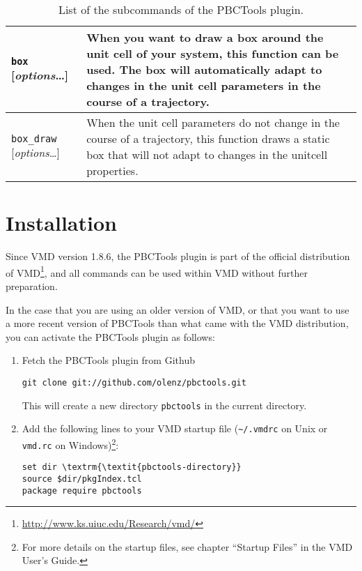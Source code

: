 \documentclass[a4paper, DIV12]{scrartcl}
\newcommand{\pbctools}{PBCTools\xspace}
\begin{document}
\begin{table}[p]
\begin{tabular}{|p{}|p{}|r|}
    \texttt{box} [\textit{options}\dots]
    & When you want to draw a box around the unit cell of your system,
    this function can be used. The box will automatically adapt to
    changes in the unit cell parameters in the course of a trajectory.
    & \pageref{sec:box}
    \\\hline
  
    \texttt{box\_draw} [\textit{options}\dots]
    & When the unit cell parameters do not change in the course of a
    trajectory, this function draws a static box that will not adapt to
    changes in the unitcell properties.
    & \pageref{sec:box_draw}
    \\\hline
  \end{tabular}
  
  \caption{List of the subcommands of the \pbctools plugin.}
  \label{tab:commands}
\end{table}

\section{Installation}

Since VMD version 1.8.6, the \pbctools plugin is part of the official
distribution of
VMD\footnote{\url{http://www.ks.uiuc.edu/Research/vmd/}}, and all
commands can be used within VMD without further preparation.

In the case that you are using an older version of VMD, or that you
want to use a more recent version of \pbctools than what came with the
VMD distribution, you can activate the \pbctools plugin as follows:

\begin{enumerate}
\item Fetch the \pbctools plugin from Github
\begin{Verbatim}
git clone git://github.com/olenz/pbctools.git
\end{Verbatim}
This will create a new directory \texttt{pbctools} in the current
directory.
\item Add the following lines to your VMD startup file
  (\verb!~/.vmdrc! on Unix or \verb!vmd.rc! on Windows)\footnote{For
    more details on the startup files, see chapter ``Startup Files''
    in the VMD User's Guide.}:
\begin{Verbatim}
set dir \textrm{\textit{pbctools-directory}}
source $dir/pkgIndex.tcl
package require pbctools
\end{Verbatim}
\end{enumerate}
\end{document}

